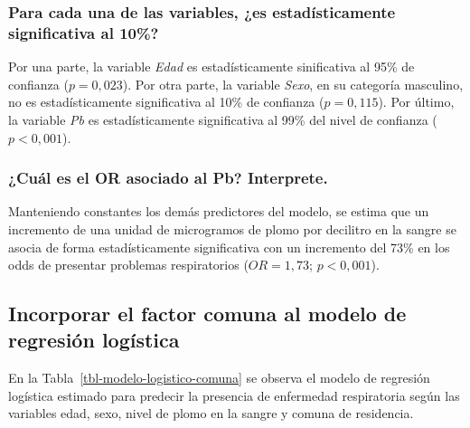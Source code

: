 \documentclass[
  english,
  10pt,
  letterpaper,
  DIV=11,
  numbers=noendperiod]{scrartcl}
\begin{document}
\subsubsection{Para cada una de las variables, ¿es estadísticamente
significativa al
10\%?}\label{para-cada-una-de-las-variables-es-estaduxedsticamente-significativa-al-10}

Por una parte, la variable \emph{Edad} es estadísticamente sinificativa
al 95\% de confianza (\(p = 0,023\)). Por otra parte, la variable
\emph{Sexo}, en su categoría masculino, no es estadísticamente
significativa al 10\% de confianza (\(p = 0,115\)). Por último, la
variable \emph{Pb} es estadísticamente significativa al 99\% del nivel
de confianza (\(p < 0,001\)).

\subsubsection{¿Cuál es el OR asociado al Pb?
Interprete.}\label{cuuxe1l-es-el-or-asociado-al-pb-interprete.}

Manteniendo constantes los demás predictores del modelo, se estima que
un incremento de una unidad de microgramos de plomo por decilitro en la
sangre se asocia de forma estadísticamente significativa con un
incremento del 73\% en los odds de presentar problemas respiratorios
(\(OR = 1,73\); \(p < 0,001\)).

\subsection{Incorporar el factor comuna al modelo de regresión
logística}\label{incorporar-el-factor-comuna-al-modelo-de-regresiuxf3n-loguxedstica}

En la Tabla~\ref{tbl-modelo-logistico-comuna} se observa el modelo de
regresión logística estimado para predecir la presencia de enfermedad
respiratoria según las variables edad, sexo, nivel de plomo en la sangre
y comuna de residencia.
\end{document}
